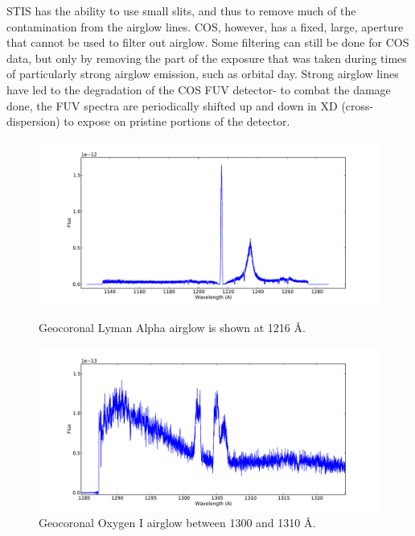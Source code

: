 STIS has the ability to use small slits, and thus to remove much of the contamination from the airglow lines.  COS, however, has a fixed, large, aperture that cannot be used to filter out airglow.  Some filtering can still be done for COS data, but only by removing the part of the exposure that was taken during times of particularly strong airglow emission, such as orbital day. Strong airglow lines have led to the degradation of the COS FUV detector- to combat the damage done, the FUV spectra are periodically shifted up and down in XD (cross-dispersion) to expose on pristine portions of the detector.

\begin{figure}
\begin{minipage}[b]{0.5\linewidth}
\centering
\includegraphics[width=\textwidth]{lya.pdf}
\caption{Geocoronal Lyman Alpha airglow is shown at 1216 \AA.}
\label{fig:geo1}
\end{minipage}
\hspace{0.5cm}
\begin{minipage}[b]{0.5\linewidth}
\centering
\includegraphics[width=\textwidth]{OIII.pdf}
\caption{Geocoronal Oxygen I airglow between 1300 and 1310 \AA.}
\label{fig:geo2}
\end{minipage}
\end{figure}


